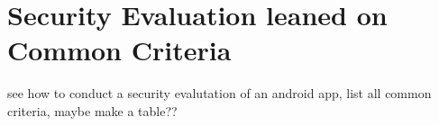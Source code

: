 \section{Security Evaluation leaned on Common Criteria}
\label{seceval}
see how to conduct a security evalutation of an android app, list all common criteria, maybe make a table??